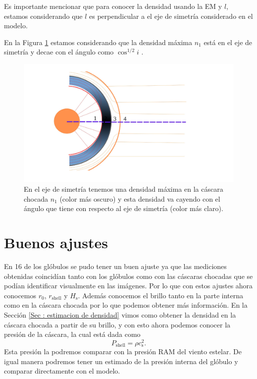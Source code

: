 \documentclass{book}
\begin{document}
Es importante mencionar que para conocer la densidad usando la EM y
$l$, estamos considerando que $l$ es perpendicular a el eje de
simetría considerado en el modelo.

En la Figura \ref{fig:dens_angl} estamos considerando que la densidad
máxima $n_1$ está en el eje de simetría y decae con el ángulo como
$\cos^{1/2} i$ \citep{Tarango:2018}.

\begin{figure}[htb]
    \centering    \includegraphics[width=\textwidth]{Nuevas imagenes finales/densi_angle.pdf}
    \caption{En el eje de simetría tenemos una densidad máxima en la
      cáscara chocada $n_1$ (color más oscuro) y esta densidad va
      cayendo con el ángulo que tiene con respecto al eje de simetría
      (color más claro).}
    \label{fig:dens_angl}
\end{figure}


\section{Buenos ajustes}\label{Good results}

En 16 de los glóbulos se pudo tener un buen ajuste ya que las
mediciones obtenidas coincidían tanto con los glóbulos como con las
cáscaras chocadas que se podían identificar visualmente en las
imágenes. Por lo que con estos ajustes ahora conocemos $r_0$,
$r_\mathrm{shell}$ y $H_\mathrm{s}$. Además conocemos el brillo tanto
en la parte interna como en la cáscara chocada por lo que podemos
obtener más información. En la Sección \ref{Sec : estimacion de
  densidad} vimos como obtener la densidad en la cáscara chocada a
partir de su brillo, y con esto ahora podemos conocer la presión de la
cáscara, la cual está dada como
\begin{equation}
    P_\mathrm{shell}=\rho c_\mathrm{s}^2.
\end{equation}
Esta presión la podremos comparar con la presión RAM del viento
estelar. De igual manera podremos tener un estimado de la presión
interna del glóbulo y comparar directamente con el modelo.
\end{document}
